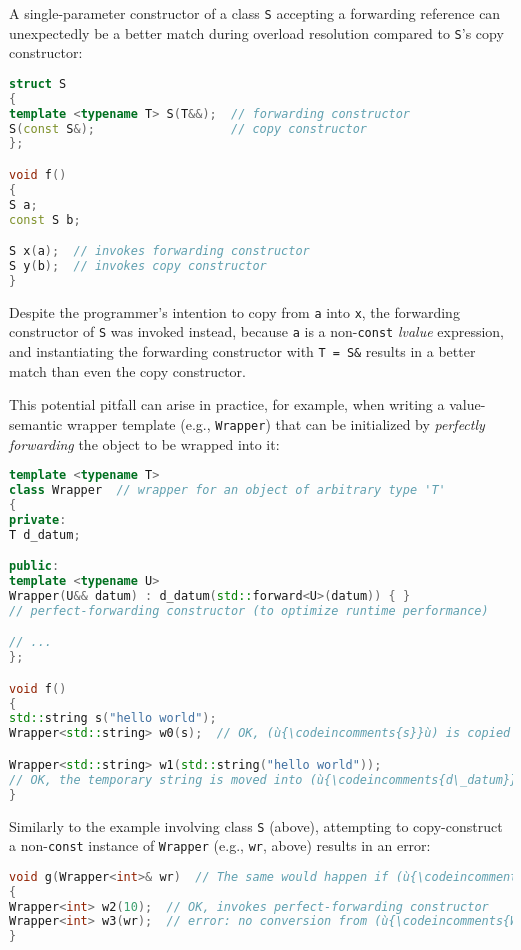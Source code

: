 A single-parameter constructor of a class \texttt{S} accepting a
forwarding reference can unexpectedly be a better match during overload
resolution compared to \texttt{S}'s copy constructor:

\begin{lstlisting}[language=C++]
struct S
{
template <typename T> S(T&&);  // forwarding constructor
S(const S&);                   // copy constructor
};

void f()
{
S a;
const S b;

S x(a);  // invokes forwarding constructor
S y(b);  // invokes copy constructor
}
\end{lstlisting}

\noindent Despite the programmer's intention to copy from \texttt{a} into
\texttt{x}, the forwarding constructor of \texttt{S} was invoked
instead, because \texttt{a} is a non-\texttt{const} \emph{lvalue}
expression, and instantiating the forwarding constructor with
\texttt{T}~\texttt{=}~\texttt{S\&} results in a better match than even
the copy constructor.

This potential pitfall can arise in practice, for example, when writing
a value-semantic wrapper template (e.g., \texttt{Wrapper}) that can be
initialized by \textit{perfectly forwarding} the object to be wrapped into it:

\begin{lstlisting}[language=C++]
template <typename T>
class Wrapper  // wrapper for an object of arbitrary type 'T'
{
private:
T d_datum;

public:
template <typename U>
Wrapper(U&& datum) : d_datum(std::forward<U>(datum)) { }
// perfect-forwarding constructor (to optimize runtime performance)

// ...
};

void f()
{
std::string s("hello world");
Wrapper<std::string> w0(s);  // OK, (ù{\codeincomments{s}}ù) is copied into (ù{\codeincomments{d\_datum}}ù).

Wrapper<std::string> w1(std::string("hello world"));
// OK, the temporary string is moved into (ù{\codeincomments{d\_datum}}ù).
}
\end{lstlisting}

\noindent Similarly to the example involving class \texttt{S} (above), attempting
to copy-construct a non-\texttt{const} instance of \texttt{Wrapper}
(e.g., \texttt{wr}, above) results in an error:

\begin{lstlisting}[language=C++]
void g(Wrapper<int>& wr)  // The same would happen if (ù{\codeincomments{wr}}ù) were passed by value.
{
Wrapper<int> w2(10);  // OK, invokes perfect-forwarding constructor
Wrapper<int> w3(wr);  // error: no conversion from (ù{\codeincomments{Wrapper<int>}}ù) to (ù{\codeincomments{int}}ù)
}
\end{lstlisting}


